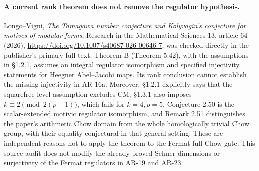 \paragraph{A current rank theorem does not remove the regulator hypothesis.}
Longo--Vigni, \emph{The Tamagawa number conjecture and Kolyvagin's
conjecture for motives of modular forms}, Research in the Mathematical
Sciences 13, article 64 (2026),
\url{https://doi.org/10.1007/s40687-026-00646-7}, was checked directly
in the publisher's primary full text.  Theorem B (Theorem 5.42),
with the assumptions in \S1.2.1, assumes an integral regulator
isomorphism and specified injectivity statements for Heegner
Abel--Jacobi maps.  Its rank conclusion cannot establish the missing
injectivity in AR-16a.  Moreover, \S1.2.1 explicitly says that the
squarefree-level assumption excludes CM; \S1.3.1 also imposes
$k\equiv2\pmod{2(p-1)}$, which fails for $k=4,p=5$.
Conjecture 2.50 is the scalar-extended motivic regulator isomorphism,
and Remark 2.51 distinguishes the paper's arithmetic Chow domain
from the whole homologically trivial Chow group, with their equality
conjectural in that general setting.  These are independent reasons
not to apply the theorem to the Fermat full-Chow gate.  This source
audit does not modify the already proved Selmer dimensions or
surjectivity of the Fermat regulators in AR-19 and AR-23.
